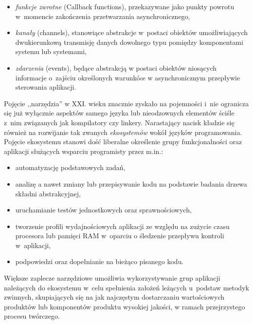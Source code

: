 {\begin{itemize}
  \begin{itemize}
    \item \emph{funkcje zwrotne} (Callback functions), przekazywane jako punkty powrotu w~momencie zakończenia przetwarzania asynchronicznego,
    \item \emph{kanały} (channels), stanowiące abstrakcje w~postaci obiektów umożliwiających dwukierunkową transmisję danych dowolnego typu pomiędzy komponentami systemu lub systemami,
    \item \emph{zdarzenia} (events), będące abstrakcją w postaci obiektów niosących informacje o~zajściu określonych warunkóœ w asynchronicznym przepływie sterowania aplikacji.
  \end{itemize}
\end{itemize}
}

\par{
  Pojęcie ,,narzędzia'' w XXI. wieku znacznie zyskało na pojemności i~nie ogranicza się już wyłącznie aspektów samego języka lub nieodzownych elementów ściśle z~nim związanych jak kompilatory czy linkery.
  Narastający nacisk kładzie się również na rozwijanie tak zwanych \emph{ekosystemów} wokół języków programowania.
  Pojęcie ekosystemu stanowi dość liberalne określenie grupy funkcjonalności oraz aplikacji służących wsparciu programisty przez m.in.:
  \begin{itemize}
    \item automatyzację podstawowych zadań,
    \item analizę a nawet zmiany lub przepisywanie kodu na podstawie badania drzewa składni abstrakcyjnej,
    \item uruchamianie testów jednostkowych oraz sprawnościowych,
    \item tworzenie profili wydajnościowych aplikacji ze względu na zużycie czasu procesora lub pamięci RAM w~oparciu o śledzenie przepływu kontroli w~aplikacji,
    \item podpowiedzi oraz dopełnianie na bieżąco pisanego kodu.
  \end{itemize}
}

\par{
  Większe zaplecze narzędziowe umożliwia wykorzystywanie grup aplikacji należących do ekosystemu w~celu spełnienia założeń leżących u~podstaw metodyk zwinnych, skupiających się na jak najczęstym dostarczaniu wartościowych produktów lub komponentów produktu wysokiej jakości, w ramach przejrzystego procesu twórczego.
}




